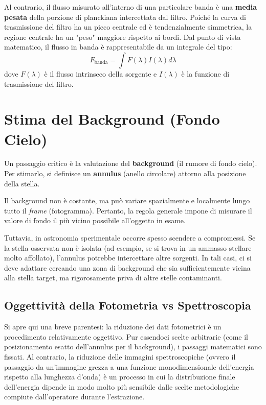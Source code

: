 Al contrario, il flusso misurato all'interno di una particolare banda è una \textbf{media pesata} della porzione di planckiana intercettata dal filtro. Poiché la curva di trasmissione del filtro ha un picco centrale ed è tendenzialmente simmetrica, la regione centrale ha un "peso" maggiore rispetto ai bordi. Dal punto di vista matematico, il flusso in banda è rappresentabile da un integrale del tipo:
\begin{equation}
F_{\text{banda}} = \int F(\lambda) I(\lambda) d\lambda
\end{equation}
dove $F(\lambda)$ è il flusso intrinseco della sorgente e $I(\lambda)$ è la funzione di trasmissione del filtro.

\section{Stima del Background (Fondo Cielo)}

Un passaggio critico è la valutazione del \textbf{background} (il rumore di fondo cielo). Per stimarlo, si definisce un \textbf{annulus} (anello circolare) attorno alla posizione della stella.

Il background non è costante, ma può variare spazialmente e localmente lungo tutto il \textit{frame} (fotogramma). Pertanto, la regola generale impone di misurare il valore di fondo il più vicino possibile all'oggetto in esame.

Tuttavia, in astronomia sperimentale occorre spesso scendere a compromessi. Se la stella osservata non è isolata (ad esempio, se si trova in un ammasso stellare molto affollato), l'annulus potrebbe intercettare altre sorgenti. In tali casi, ci si deve adattare cercando una zona di background che sia sufficientemente vicina alla stella target, ma rigorosamente priva di altre stelle contaminanti.

\subsection{Oggettività della Fotometria vs Spettroscopia}
Si apre qui una breve parentesi: la riduzione dei dati fotometrici è un procedimento relativamente oggettivo. Pur essendoci scelte arbitrarie (come il posizionamento esatto dell'annulus per il background), i passaggi matematici sono fissati. Al contrario, la riduzione delle immagini spettroscopiche (ovvero il passaggio da un'immagine grezza a una funzione monodimensionale dell'energia rispetto alla lunghezza d'onda) è un processo in cui la distribuzione finale dell'energia dipende in modo molto più sensibile dalle scelte metodologiche compiute dall'operatore durante l'estrazione.

